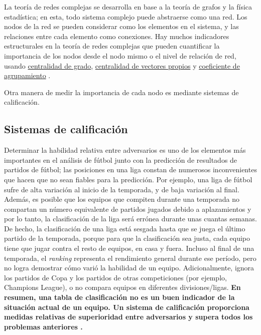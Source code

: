 La teoría de redes complejas se desarrolla en base a la teoría de grafos y la física estadística; en esta, 
todo sistema complejo puede abstraerse como una red. Los nodos de la red se pueden 
considerar como los elementos en el sistema, y las relaciones
entre cada elemento como conexiones. Hay muchos indicadores estructurales
en la teoría de redes complejas que pueden cuantificar la importancia de los nodos desde el nodo mismo o el
nivel de relación de red, usando \href{https://link.springer.com/10.1007%2F978-1-4419-9863-7_935}{centralidad de grado}, 
\href{https://neo4j.com/docs/graph-data-science/current/algorithms/eigenvector-centrality/}{centralidad de vectores propios} 
y \href{https://en.wikipedia.org/wiki/Clustering_coefficient}{coeficiente de agrupamiento} \cite{albert2002statistical}.
 
Otra manera de medir la importancia de cada nodo es mediante sistemas de calificación.

\subsection{Sistemas de calificación} \label{subsect:ratings}
Determinar la habilidad relativa entre adversarios es uno de los elementos
más importantes en el análisis de fútbol junto con la predicción de resultados de partidos de fútbol; las posiciones en 
una liga constan de numerosos inconvenientes que hacen que no sean fiables para la predicción. 
Por ejemplo, una liga de fútbol sufre de alta variación al inicio de la temporada, y de baja 
variación al final. Además, es posible que los equipos que compiten durante una temporada no
compartan un número equivalente de partidos jugados debido a aplazamientos y
por lo tanto, la clasificación de la liga será errónea durante unas cuantas semanas. De hecho, 
la clasificación de una liga está sesgada hasta que se juega el último partido de la temporada, porque
para que la clasificación sea justa, cada equipo tiene que jugar contra el resto de equipos, en
casa y fuera. Incluso al final de una temporada, el \textit{ranking} representa
el rendimiento general durante ese período, pero no logra
demostrar cómo varió la habilidad de un equipo. Adicionalmente,
ignora los partidos de Copa y los partidos de otras competiciones (por ejemplo, Champions
League), o no compara equipos en diferentes divisiones/ligas. \textbf{En
resumen, una tabla de clasificación no es un buen indicador de la situación actual de un equipo. Un 
sistema de calificación proporciona medidas relativas de superioridad entre adversarios y supera 
todos los problemas anteriores \cite{pi-ratings}.}

